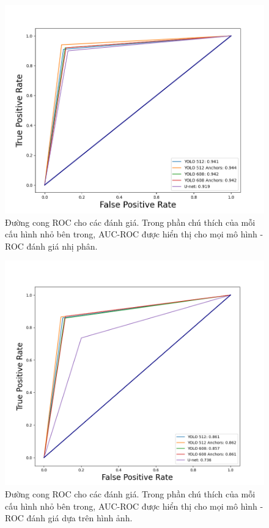 \documentclass[../the.tex]{subfiles}
\begin{document}
\begin{figure}[ht!]
\centering
	\includegraphics[width=1\textwidth]{images/roc1_new.png}
	\caption{Đường cong ROC cho các đánh giá. Trong phần chú thích của mỗi cấu hình nhỏ bên trong, AUC-ROC được hiển thị cho mọi mô hình - ROC đánh giá nhị phân.}
	\label{fig:roc1}
\end{figure}

\begin{figure}[ht!]
\centering
	\includegraphics[width=1\textwidth]{images/roc2_new.png}
	\caption{Đường cong ROC cho các đánh giá. Trong phần chú thích của mỗi cấu hình nhỏ bên trong, AUC-ROC được hiển thị cho mọi mô hình - ROC đánh giá dựa trên hình ảnh.}
	\label{fig:roc2}
\end{figure}
\end{document}
